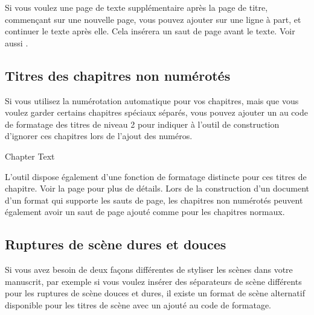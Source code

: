 \documentclass[a4paper,11pt,french]{sphinxmanual}
\begin{document}
\sphinxAtStartPar
Si vous voulez une page de texte supplémentaire après la page de titre, commençant sur une nouvelle page, vous pouvez ajouter  sur une ligne à part, et continuer le texte après elle. Cela insérera un saut de page avant le texte. Voir aussi {\hyperref[\detokenize{usage_format:a-fmt-break}]{}}.


\subsection{Titres des chapitres non numérotés}
\label{\detokenize{project_structure:unnumbered-chapter-headings}}\label{\detokenize{project_structure:a-struct-heads-unnum}}
\sphinxAtStartPar
Si vous utilisez la numérotation automatique pour vos chapitres, mais que vous voulez garder certains chapitres spéciaux séparés, vous pouvez ajouter un \sphinxtitleref{!} au code de formatage des titres de niveau 2 pour indiquer à l’outil de construction d’ignorer ces chapitres lors de l’ajout des numéros.

\begin{sphinxVerbatim}[commandchars=\\\{\}]

Chapter Text
\end{sphinxVerbatim}

\sphinxAtStartPar
L’outil  dispose également d’une fonction de formatage distincte pour ces titres de chapitre. Voir la page {\hyperref[\detokenize{project_manuscript:a-manuscript}]{}} pour plus de détails. Lors de la construction d’un document d’un format qui supporte les sauts de page, les chapitres non numérotés peuvent également avoir un saut de page ajouté comme pour les chapitres normaux.


\subsection{Ruptures de scène dures et douces}
\label{\detokenize{project_structure:hard-and-soft-scene-breaks}}\label{\detokenize{project_structure:a-struct-heads-scenes}}
\sphinxAtStartPar
Si vous avez besoin de deux façons différentes de styliser les scènes dans votre manuscrit, par exemple si vous voulez insérer des séparateurs de scène différents pour les ruptures de scène douces et dures, il existe un format de scène alternatif disponible pour les titres de scène avec un \sphinxtitleref{!} ajouté au code de formatage.
\end{document}
